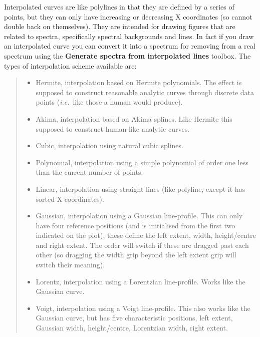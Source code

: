 \documentclass[twoside,11pt]{article}
\renewcommand{\_}{\texttt{\symbol{95}}}
\newcommand{\labelitem}[1]{\textbf{#1}}
\newcommand{\ie}{\textit{i.e.}}
\begin{document}
Interpolated curves are like polylines in that they are defined by a series of
points, but they can only have increasing or decreasing X coordinates (so
cannot double back on themselves). They are intended for drawing figures that
are related to spectra, specifically spectral backgrounds and lines. In fact
if you draw an interpolated curve you can convert it into a spectrum for
removing from a real spectrum using the \labelitem{Generate spectra from
interpolated lines} toolbox. The types of interpolation scheme available are:
\begin{quote}
\begin{itemize}

  \item Hermite, interpolation based on Hermite polynomials. The effect is
        supposed to construct reasonable analytic curves through discrete data
        points (\ie\ like those a human would produce).

  \item Akima, interpolation based on Akima splines. Like Hermite this
        supposed to construct human-like analytic curves.

  \item Cubic, interpolation using natural cubic splines.

  \item Polynomial, interpolation using a simple polynomial of order one less
        than the current number of points.

  \item Linear, interpolation using straight-lines (like polyline, except it
        has sorted X coordinates).

  \item Gaussian, interpolation using a Gaussian line-profile. This can only
        have four reference positions (and is initialised from the first two
        indicated on the plot), these define the left extent, width,
        height/centre and right extent. The order will switch if these are
        dragged past each other (so dragging the width grip beyond the left
        extent grip will switch their meaning).

  \item Lorentz, interpolation using a Lorentzian line-profile. Works like the
        Gaussian curve.

  \item Voigt, interpolation using a Voigt line-profile. This also works like
        the Gaussian curve, but has five characteristic positions, left
        extent, Gaussian width, height/centre, Lorentzian width, right extent.

\end{itemize}
\end{quote}
\end{document}
